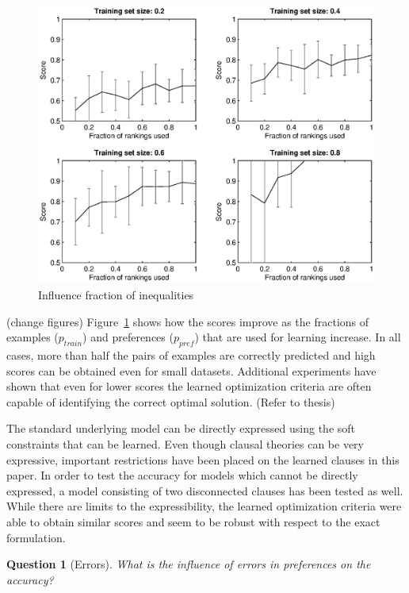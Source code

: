 \documentclass[letterpaper]{article}
\newtheorem{question}{Question}
\theoremstyle{definition}
\newcommand{\sam}[1]{{\color{red}(#1)}}
\begin{document}
\begin{figure}
  \centering
    \includegraphics[width=1.1\linewidth]{rankings}
  \caption{Influence fraction of inequalities}
  \label{fig:fractie}
\end{figure}

\sam{change figures}
Figure~\ref{fig:fractie} shows how the scores improve as the fractions of examples ($p_{train}$) and preferences ($p_{pref}$) that are used for learning increase.
In all cases, more than half the pairs of examples are correctly predicted and high scores can be obtained even for small datasets.
Additional experiments have shown that even for lower scores the learned optimization criteria are often capable of identifying the correct optimal solution. \sam{Refer to thesis}

The standard underlying model can be directly expressed using the soft constraints that can be learned.
Even though clausal theories can be very expressive, important restrictions have been placed on the learned clauses in this paper.
In order to test the accuracy for models which cannot be directly expressed, a model consisting of two disconnected clauses has been tested as well.
While there are limits to the expressibility, the learned optimization criteria were able to obtain similar scores and seem to be robust with respect to the exact formulation.

\begin{question}[Errors]
  What is the influence of errors in preferences on the accuracy?
\end{question}
\end{document}
